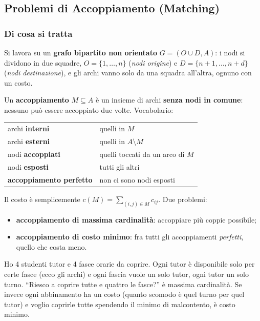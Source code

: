 \documentclass[12pt]{extarticle} %
\begin{document}
\subsection{Problemi di Accoppiamento (Matching)}

\subsubsection{Di cosa si tratta}
Si lavora su un \textbf{grafo bipartito non orientato} $G = (O \cup D, A)$: i nodi si dividono in due squadre, $O = \{1,\dots,n\}$ (\emph{nodi origine}) e $D = \{n+1,\dots,n+d\}$ (\emph{nodi destinazione}), e gli archi vanno solo da una squadra all'altra, ognuno con un costo.

\noindent Un \textbf{accoppiamento} $M \subseteq A$ è un insieme di archi \textbf{senza nodi in comune}: nessuno può essere accoppiato due volte. Vocabolario:
\begin{center}
\begin{tabular}{ll}
\hline
archi \textbf{interni} & quelli in $M$ \\
archi \textbf{esterni} & quelli in $A \setminus M$ \\
nodi \textbf{accoppiati} & quelli toccati da un arco di $M$ \\
nodi \textbf{esposti} & tutti gli altri \\
\textbf{accoppiamento perfetto} & non ci sono nodi esposti \\
\hline
\end{tabular}
\end{center}
Il costo è semplicemente $c(M) = \sum_{(i,j) \in M} c_{ij}$. Due problemi:
\begin{itemize}
    \item \textbf{accoppiamento di massima cardinalità}: accoppiare più coppie possibile;
    \item \textbf{accoppiamento di costo minimo}: fra tutti gli accoppiamenti \emph{perfetti}, quello che costa meno.
\end{itemize}

\begin{tcolorbox}[colback=green!4, colframe=green!45!black, title=\textbf{Esempio personale: i turni del laboratorio}]
Ho 4 studenti tutor e 4 fasce orarie da coprire. Ogni tutor è disponibile solo per certe fasce (ecco gli archi) e ogni fascia vuole un solo tutor, ogni tutor un solo turno. ``Riesco a coprire tutte e quattro le fasce?'' è massima cardinalità. Se invece ogni abbinamento ha un costo (quanto scomodo è quel turno per quel tutor) e voglio coprirle tutte spendendo il minimo di malcontento, è costo minimo.
\end{tcolorbox}
\end{document}
